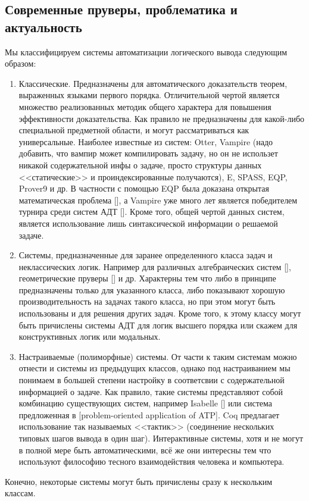 \subsection{Современные пруверы, проблематика и актуальность}

Мы классифицируем системы автоматизации логического вывода следующим образом:
\begin{enumerate}
\item Классические. Предназначены для автоматического доказательств теорем, выраженных языками первого порядка. Отличительной чертой является множество реализованных методик общего характера для повышения эффективности доказательства. Как правило не предназначены для какой-либо специальной предметной области, и могут рассматриваться как универсальные. Наиболее известные из систем: Otter, Vampire (надо добавить, что вампир может компилировать задачу, но он не использет никакой содержательной инфы о задаче, просто структуры данных <<статические>> и проиндексированные получаются), E, SPASS, EQP, Prover9 и др.  В частности  с помощью EQP была доказана открытая математическая проблема [], а Vampire уже много лет является победителем турнира среди систем АДТ []. Кроме того, общей чертой данных систем, является использование лишь синтаксической информации о решаемой задаче.

\item Системы, предназначенные для заранее определенного класса задач и неклассических логик. Например для различных алгебраических систем [], геометрические пруверы [] и др. Характерны тем что либо в принципе предназначены только для указанного класса, либо показывают хорошую производительность на задачах такого класса, но при этом могут быть использованы и для решения других задач. Кроме того, к этому классу могут быть причислены системы АДТ для логик высшего порядка или скажем для конструктивных логик или модальных.

\item Настраиваемые (полиморфные) системы. От части к таким системам можно отнести и системы из предыдущих классов, однако под настраиванием мы понимаем в большей степени настройку в соответсвии с содержательной информацией о задаче. Как правило, такие системы представляют собой комбинацию существующих систем, например Isabelle [] или система предложенная в [problem-oriented application of ATP]. Coq предлагает использование так называемых <<тактик>> (соединение нескольких типовых шагов вывода в один шаг). Интерактивные системы, хотя и не могут в полной мере быть автоматическими, всё же они интересны тем что используют философию тесного взаимодействия человека и компьютера.
\end{enumerate}
Конечно, некоторые системы могут быть причислены сразу к нескольким классам.


